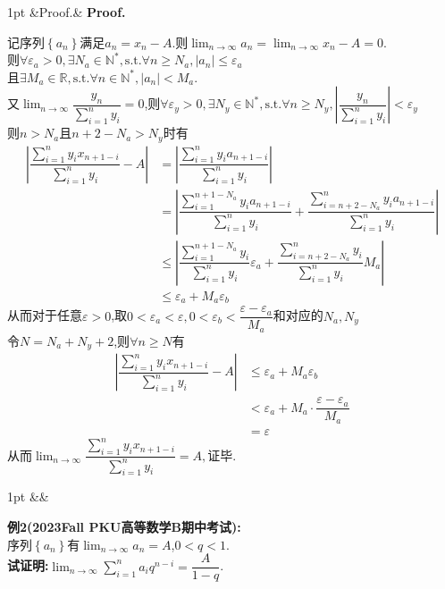 \documentclass{ctexart}
\newcommand{\R}{\mathbb{R}}
\newcommand{\N}{\mathbb{N}}
\newcommand{\ep}{\varepsilon}
\newcommand{\st}{,\text{s.t.}}
\newenvironment{solution}[1][]{%
\def\FrameCommand{%
\hspace{1pt}%
{\color{solutionline}\vrule width 2pt}%
{\color{solutionshade}\vrule width 4pt}%
\colorbox{solutionshade}%
}%
\MakeFramed{\advance\hsize-\width\FrameRestore}%
\noindent\hspace{-4.55pt}%
\begin{adjustwidth}{}{1pt}%
\setlength{\parindent}{0pt}%
\vspace{3pt}%
\ifx&#1&\else %
    \textbf{#1}\par\vspace{1pt}%
\fi
}
{%
\vspace{2pt}%
\end{adjustwidth}\endMakeFramed%
}
\newenvironment{problem}[1][]{%
\def\FrameCommand{%
\hspace{1pt}%
{\color{problemline}\vrule width 2pt}%
{\color{problemshade}\vrule width 4pt}%
\colorbox{problemshade}%
}%
\MakeFramed{\advance\hsize-\width\FrameRestore}%
\noindent\hspace{-4.55pt}%
\begin{adjustwidth}{}{1pt}%
\setlength{\parindent}{0pt}%
\vspace{3pt}%
\ifx&#1&\else %
    \textbf{#1}\par\vspace{1pt}%
\fi
}
{%
\vspace{2pt}%
\end{adjustwidth}\endMakeFramed%
}
\begin{document}
\begin{solution}[Proof.]
    记序列$\left\{ a_n\right\}$满足$a_n=x_n-A$.则$\displaystyle\lim_{n\to\infty}{a_n}=\lim_{n\to\infty}{x_n}-A=0$.\\
    则$\forall \varepsilon_a>0,\exists N_a\in\mathbb{N}^*\st\forall n\geqslant N_a,\left\lvert a_n\right\rvert\leqslant\varepsilon_a$\\
    且$\exists M_a\in\R\st\forall n\in\N^*,\left|a_n\right|<M_a$.\\
    又$\displaystyle\lim_{n\to\infty}\dfrac{y_n}{\sum_{i=1}^{n}{y_i}}=0$,则$\forall\ep_y>0,\exists N_y\in\N^*\st\forall n\geqslant N_y,\left|\dfrac{y_n}{\sum_{i=1}^{n}{y_i}}\right|<\ep_y$\\
    则$n>N_a$且$n+2-N_a>N_y$时有\begin{align*}
        \left|\dfrac{\sum_{i=1}^{n}{y_ix_{n+1-i}}}{\sum_{i=1}^{n}{y_i}}-A\right|
        &= \left|\dfrac{\sum_{i=1}^{n}{y_ia_{n+1-i}}}{\sum_{i=1}^{n}{y_i}}\right| \\
        &= \left|\dfrac{\sum_{i=1}^{n+1-N_a}{y_ia_{n+1-i}}}{\sum_{i=1}^{n}{y_i}}+\dfrac{\sum_{i=n+2-N_a}^{n}{y_ia_{n+1-i}}}{\sum_{i=1}^{n}{y_i}}\right| \\
        &\leqslant \left|\dfrac{\sum_{i=1}^{n+1-N_a}{y_i}}{\sum_{i=1}^{n}{y_i}}\ep_a+\dfrac{\sum_{i=n+2-N_a}^{n}{y_i}}{\sum_{i=1}^{n}{y_i}}M_a\right| \\
        &\leqslant \ep_a+M_a\ep_b 
    \end{align*}
    从而对于任意$\ep>0$,取$0<\ep_a<\ep,0<\ep_b<\dfrac{\ep-\ep_a}{M_a}$和对应的$N_a,N_y$\\
    令$N=N_a+N_y+2$,则$\forall n\geqslant N$有\begin{align*}
        \left|\dfrac{\sum_{i=1}^{n}{y_ix_{n+1-i}}}{\sum_{i=1}^{n}{y_i}}-A\right|
        &\leqslant \ep_a+M_a\ep_b \\
        &< \ep_a+M_a\cdot\dfrac{\ep-\ep_a}{M_a} \\
        &= \ep
    \end{align*}
    从而$\displaystyle\lim_{n\to\infty}{\dfrac{\sum_{i=1}^{n}{y_ix_{n+1-i}}}{\sum_{i=1}^{n}{y_i}}}=A,$证毕.
\end{solution}
\begin{problem}
    \textbf{例2(2023Fall PKU高等数学B期中考试):} \\
    序列$\left\{ a_n\right\}$有$\displaystyle\lim_{n\to\infty}{a_n}=A$,$0<q<1$.\\
    \textbf{试证明:}$\displaystyle\lim_{n\to\infty}{\sum_{i=1}^{n}{a_iq^{n-i}}}=\dfrac{A}{1-q}$.\\
\end{problem}
\end{document}
